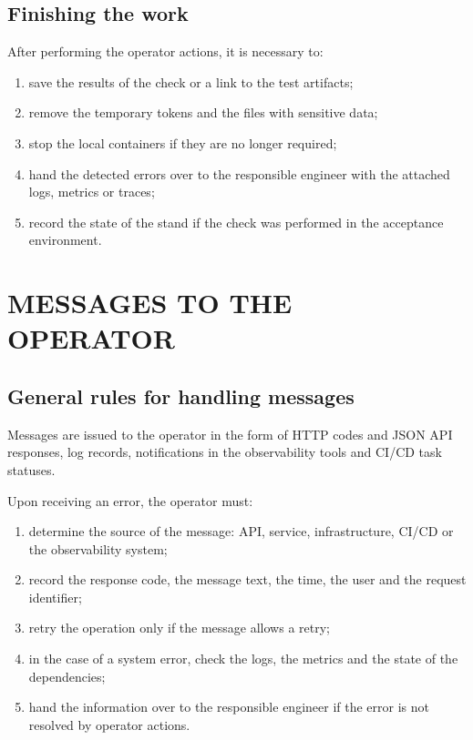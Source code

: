 \documentclass[12pt,a4paper]{extarticle}
\begin{document}
\subsection{Finishing the work}

\begin{hseExample}
After performing the operator actions, it is necessary to:

\begin{enumerate}[label=\arabic*), leftmargin=1.25cm]
    \item save the results of the check or a link to the test artifacts;
    \item remove the temporary tokens and the files with sensitive data;
    \item stop the local containers if they are no longer required;
    \item hand the detected errors over to the responsible engineer with the attached logs, metrics or traces;
    \item record the state of the stand if the check was performed in the acceptance environment.
\end{enumerate}
\end{hseExample}

\clearpage

\section{MESSAGES TO THE OPERATOR}

\subsection{General rules for handling messages}

\begin{hseExample}
Messages are issued to the operator in the form of HTTP codes and JSON API responses, log records, notifications in the observability tools and CI/CD task statuses.

Upon receiving an error, the operator must:

\begin{enumerate}[label=\arabic*), leftmargin=1.25cm]
    \item determine the source of the message: API, service, infrastructure, CI/CD or the observability system;
    \item record the response code, the message text, the time, the user and the request identifier;
    \item retry the operation only if the message allows a retry;
    \item in the case of a system error, check the logs, the metrics and the state of the dependencies;
    \item hand the information over to the responsible engineer if the error is not resolved by operator actions.
\end{enumerate}
\end{hseExample}
\end{document}
